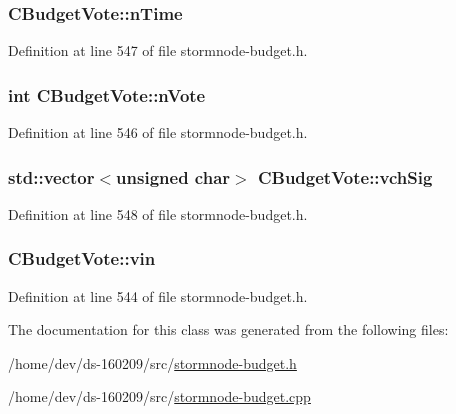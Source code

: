 \subsubsection[{n\+Time}]{ C\+Budget\+Vote\+::n\+Time}\label{class_c_budget_vote_a7cde3552eacf54d86796d3ff48601125}


Definition at line 547 of file stormnode-\/budget.\+h.

\hypertarget{class_c_budget_vote_a6eafe2cf4bca2b25d5662b2601334a8d}{}
\subsubsection[{n\+Vote}]{\setlength{\rightskip}{0pt plus 5cm}int C\+Budget\+Vote\+::n\+Vote}\label{class_c_budget_vote_a6eafe2cf4bca2b25d5662b2601334a8d}


Definition at line 546 of file stormnode-\/budget.\+h.

\hypertarget{class_c_budget_vote_abe31c3e9d62a7254550030f2b67643d7}{}
\subsubsection[{vch\+Sig}]{\setlength{\rightskip}{0pt plus 5cm}std\+::vector$<$unsigned char$>$ C\+Budget\+Vote\+::vch\+Sig}\label{class_c_budget_vote_abe31c3e9d62a7254550030f2b67643d7}


Definition at line 548 of file stormnode-\/budget.\+h.

\hypertarget{class_c_budget_vote_a335d3b479d57994097eccb52b50cbe53}{}
\subsubsection[{vin}]{ C\+Budget\+Vote\+::vin}\label{class_c_budget_vote_a335d3b479d57994097eccb52b50cbe53}


Definition at line 544 of file stormnode-\/budget.\+h.



The documentation for this class was generated from the following files\+:\begin{DoxyCompactItemize}
\item 
/home/dev/ds-\/160209/src/\hyperlink{stormnode-budget_8h}{stormnode-\/budget.\+h}\item 
/home/dev/ds-\/160209/src/\hyperlink{stormnode-budget_8cpp}{stormnode-\/budget.\+cpp}\end{DoxyCompactItemize}
